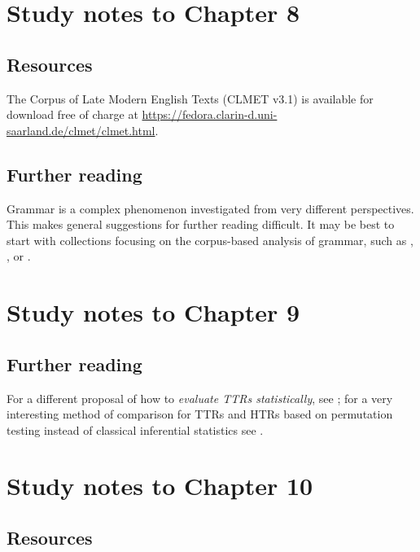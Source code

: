 \section{Study notes to Chapter 8}
\label{sec:studynotes08}

\subsection*{Resources}

The Corpus of Late Modern English Texts (CLMET v3.1) is available for download free of charge at \url{https://fedora.clarin-d.uni-saarland.de/clmet/clmet.html}.

\subsection*{Further reading}

Grammar is a complex phenomenon investigated from very different perspectives. This makes general suggestions for further reading difficult. It may be best to start with collections focusing on the corpus-based analysis of grammar, such as \citet{rohdenburg_determinants_2003}, \citet{gries_corpora_2006}, \citet{rohdenburg_one_2009} or \citet{lindquist_corpus_2004}.

\section{Study notes to Chapter 9}
\label{sec:studynotes09}

\subsection*{Further reading}

For a different proposal of how to \textit{evaluate TTRs statistically}, see \citet[Section 6.5]{baayen_analyzing_2008}; for a very interesting method of comparison for TTRs and HTRs based on permutation testing instead of classical inferential statistics see \citet{saily_comparing_2009}.

\section{Study notes to Chapter 10}
\label{sec:studynotes10}

\subsection*{Resources}

